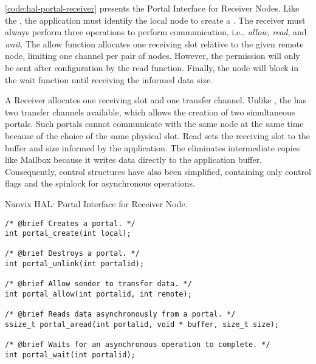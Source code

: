 
				\autoref{code:hal-portal-receiver} presents the Portal Interface for
				Receiver Nodes. Like the \mailbox, the application must identify the
				local node to create a \portal. The receiver must always perform
				three operations to perform communication, i.e., \textit{allow},
				\textit{read}, and \textit{wait}. The allow function allocates one
				receiving slot relative to the given remote node, limiting one
				channel per pair of nodes. However, the permission will only be
				sent after \dma configuration by the read function. Finally, the
				node will block in the wait function until receiving the informed
				data size.

				A Receiver allocates one \dnoc receiving slot and one \cnoc transfer
				channel. Unlike \mailbox, the \portal has two transfer channels
				available, which allows the creation of two simultaneous portals.
				Such portals cannot communicate with the same node at the same time
				because of the choice of the same physical slot. Read sets the
				receiving slot to the buffer and size informed by the application.
				The \dma eliminates intermediate copies like Mailbox because it
				writes data directly to the application buffer. Consequently,
				control structures have also been simplified, containing only
				control flags and the spinlock for asynchronous operations.

\begin{listing}[!tb]
\caption{Nanvix HAL: Portal Interface for Receiver Node.}
\label{code:hal-portal-receiver}
\begin{verbatim}
/* @brief Creates a portal. */
int portal_create(int local);

/* @brief Destroys a portal. */
int portal_unlink(int portalid);

/* @brief Allow sender to transfer data. */
int portal_allow(int portalid, int remote);

/* @brief Reads data asynchronously from a portal. */
ssize_t portal_aread(int portalid, void * buffer, size_t size);

/* @brief Waits for an asynchronous operation to complete. */
int portal_wait(int portalid);
\end{verbatim}
\end{listing}

